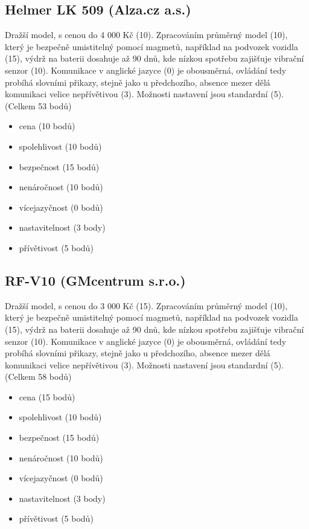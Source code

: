 \documentclass[FM,BP]{tulthesis}  %
\begin{document}
\subsection{Helmer LK 509 (Alza.cz a.s.)}
Dražší model, s cenou do 4 000 Kč (10). Zpracováním průměrný model (10), který je bezpečně umistitelný pomocí magmetů, například na podvozek vozidla (15), výdrž na baterii dosahuje až 90 dnů, kde nízkou spotřebu zajišťuje vibrační senzor (10). Komunikace v anglické jazyce (0) je obousměrná, ovládání tedy probíhá slovními přikazy, stejně jako u předchozího, absence mezer dělá komunikaci velice nepřívětivou (3). Možnosti nastavení jsou standardní (5). (Celkem 53 bodů)

\begin{itemize}
\item cena (10 bodů)
\item spolehlivost (10 bodů)
\item bezpečnost (15 bodů)
\item nenáročnost (10 bodů)
\item vícejazyčnost (0 bodů)
\item nastavitelnost (3 body)
\item přívětivost (5 bodů)
\end{itemize}

\subsection{RF-V10 (GMcentrum s.r.o.)}
Dražší model, s cenou do 3 000 Kč (15). Zpracováním průměrný model (10), který je bezpečně umistitelný pomocí magmetů, například na podvozek vozidla (15), výdrž na baterii dosahuje až 90 dnů, kde nízkou spotřebu zajišťuje vibrační senzor (10). Komunikace v anglické jazyce (0) je obousměrná, ovládání tedy probíhá slovními přikazy, stejně jako u předchozího, absence mezer dělá komunikaci velice nepřívětivou (3). Možnosti nastavení jsou standardní (5). (Celkem 58 bodů)

\begin{itemize}
\item cena (15 bodů)
\item spolehlivost (10 bodů)
\item bezpečnost (15 bodů)
\item nenáročnost (10 bodů)
\item vícejazyčnost (0 bodů)
\item nastavitelnost (3 body)
\item přívětivost (5 bodů)
\end{itemize}
\end{document}
